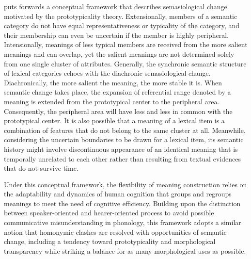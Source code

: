 \textcite{geeraerts1997diachronic} puts forwards a conceptual framework that describes semasiological change motivated by the prototypicality theory. Extensionally, members of a semantic category do not have equal representativeness or typicality of the category, and their membership can even be uncertain if the member is highly peripheral. Intensionally, meanings of less typical members are received from the more salient meanings and can overlap, yet the salient meanings are not determined solely from one single cluster of attributes. Generally, the synchronic semantic structure of lexical categories echoes with the diachronic semasiological change. Diachronically, the more salient the meaning, the more stable it is. When semantic change takes place, the expansion of referential range denoted by a meaning is extended from the prototypical center to the peripheral area. Consequently, the peripheral area will have less and less in common with the prototypical center. It is also possible that a meaning of a lexical item is a combination of features that do not belong to the same cluster at all. Meanwhile, considering the uncertain boundaries to be drawn for a lexical item, its semantic history might involve discontinuous appearance of an identical meaning that is temporally unrelated to each other rather than resulting from textual evidences that do not survive time.

Under this conceptual framework, the flexibility of meaning construction relies on the adaptability and dynamics of human cognition that groups and regroups meanings to meet the need of cognitive efficiency. Building upon the distinction between speaker-oriented and hearer-oriented process to avoid possible communicative misunderstanding in phonology, this framework adopts a similar notion that homonymic clashes are resolved with opportunities of semantic change, including a tendency toward prototypicality and morphological transparency while striking a balance for as many morphological uses as possible.

